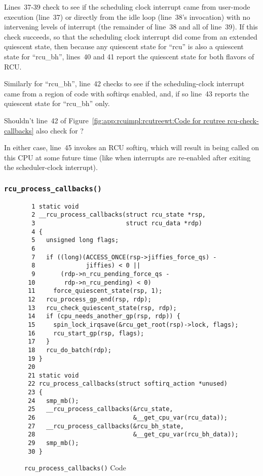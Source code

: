 Lines~37-39 check to see if the scheduling clock interrupt came
from user-mode execution (line~37) or directly from the idle
loop (line~38's  invocation) with no intervening
levels of interrupt (the remainder of line~38 and all of line~39).
If this check succeeds, so that the scheduling clock interrupt
did come from an extended quiescent state, then
because any quiescent state for ``rcu'' is also a quiescent state
for ``rcu\_bh'', lines~40 and 41 report the quiescent state for
both flavors of RCU.

Similarly for ``rcu\_bh'', line~42 checks to see if the scheduling-clock
interrupt came from a region of code with softirqs enabled, and, if so
line~43 reports the quiescent state for ``rcu\_bh'' only.

\QuickQuiz{}
	Shouldn't line~42 of
	Figure~\ref{fig:app:rcuimpl:rcutreewt:Code for rcutree rcu-check-callbacks}
	also check for ?
 \QuickQuizEnd

In either case, line~45 invokes an RCU softirq, which will result in
 being called on this CPU at some future
time (like when interrupts are re-enabled after exiting the
scheduler-clock interrupt).

\subsubsection{\tt rcu\_process\_callbacks()}
\label{app:rcuimpl:rcutreewt:rcu-process-callbacks}

\begin{figure}[tbp]
{ \scriptsize
\begin{verbatim}
  1 static void
  2 __rcu_process_callbacks(struct rcu_state *rsp,
  3                         struct rcu_data *rdp)
  4 {
  5   unsigned long flags;
  6
  7   if ((long)(ACCESS_ONCE(rsp->jiffies_force_qs) -
  8              jiffies) < 0 ||
  9       (rdp->n_rcu_pending_force_qs -
 10        rdp->n_rcu_pending) < 0)
 11     force_quiescent_state(rsp, 1);
 12   rcu_process_gp_end(rsp, rdp);
 13   rcu_check_quiescent_state(rsp, rdp);
 14   if (cpu_needs_another_gp(rsp, rdp)) {
 15     spin_lock_irqsave(&rcu_get_root(rsp)->lock, flags);
 16     rcu_start_gp(rsp, flags);
 17   }
 18   rcu_do_batch(rdp);
 19 }
 20
 21 static void
 22 rcu_process_callbacks(struct softirq_action *unused)
 23 {
 24   smp_mb();
 25   __rcu_process_callbacks(&rcu_state,
 26                           &__get_cpu_var(rcu_data));
 27   __rcu_process_callbacks(&rcu_bh_state,
 28                           &__get_cpu_var(rcu_bh_data));
 29   smp_mb();
 30 }
\end{verbatim}
}
\caption{{\tt rcu\_process\_callbacks()} Code}
\label{fig:app:rcuimpl:rcutreewt:Code for rcutree rcu-process-callbacks}
\end{figure}

